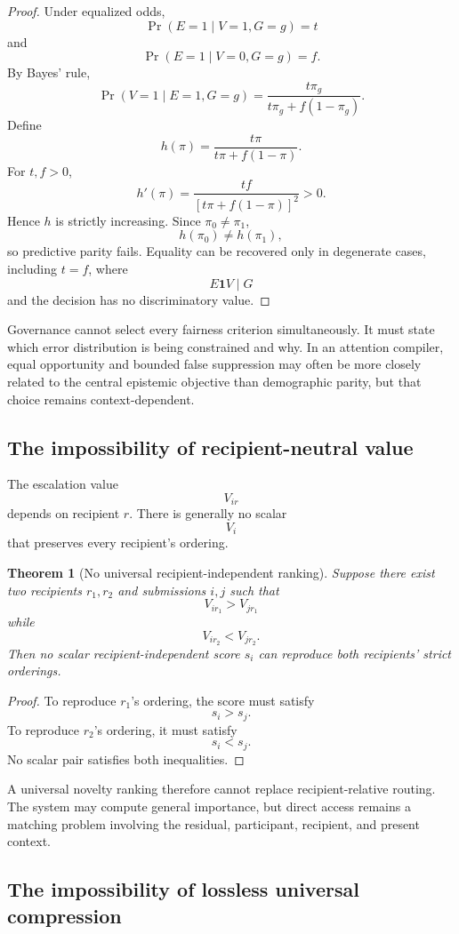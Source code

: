 \documentclass[11pt]{article}
\newtheorem{theorem}[definition]{Theorem}
\theoremstyle{definition}
\DeclareMathOperator{\Prob}{Pr}
\newcommand{\ind}{\mathbf{1}}
\begin{document}
\begin{proof}
Under equalized odds,
\[
\Prob(E=1\mid V=1,G=g)=t
\]
and
\[
\Prob(E=1\mid V=0,G=g)=f.
\]
By Bayes' rule,
\[
\Prob(V=1\mid E=1,G=g)
=
\frac{
t\pi_g
}{
t\pi_g+f(1-\pi_g)
}.
\]
Define
\[
h(\pi)
=
\frac{t\pi}{t\pi+f(1-\pi)}.
\]
For \(t,f>0\),
\[
h'(\pi)
=
\frac{tf}{[t\pi+f(1-\pi)]^2}
>0.
\]
Hence \(h\) is strictly increasing. Since \(\pi_0\neq\pi_1\),
\[
h(\pi_0)\neq h(\pi_1),
\]
so predictive parity fails. Equality can be recovered only in degenerate cases, including \(t=f\), where
\[
E\ind V\mid G
\]
and the decision has no discriminatory value.
\end{proof}

Governance cannot select every fairness criterion simultaneously. It must state which error distribution is being constrained and why. In an attention compiler, equal opportunity and bounded false suppression may often be more closely related to the central epistemic objective than demographic parity, but that choice remains context-dependent.

\subsection{The impossibility of recipient-neutral value}

The escalation value
\[
V_{ir}
\]
depends on recipient \(r\). There is generally no scalar
\[
V_i
\]
that preserves every recipient's ordering.

\begin{theorem}[No universal recipient-independent ranking]
Suppose there exist two recipients \(r_1,r_2\) and submissions \(i,j\) such that
\[
V_{ir_1}>V_{jr_1}
\]
while
\[
V_{ir_2}<V_{jr_2}.
\]
Then no scalar recipient-independent score \(s_i\) can reproduce both recipients' strict orderings.
\end{theorem}

\begin{proof}
To reproduce \(r_1\)'s ordering, the score must satisfy
\[
s_i>s_j.
\]
To reproduce \(r_2\)'s ordering, it must satisfy
\[
s_i<s_j.
\]
No scalar pair satisfies both inequalities.
\end{proof}

A universal novelty ranking therefore cannot replace recipient-relative routing. The system may compute general importance, but direct access remains a matching problem involving the residual, participant, recipient, and present context.

\subsection{The impossibility of lossless universal compression}
\end{document}
